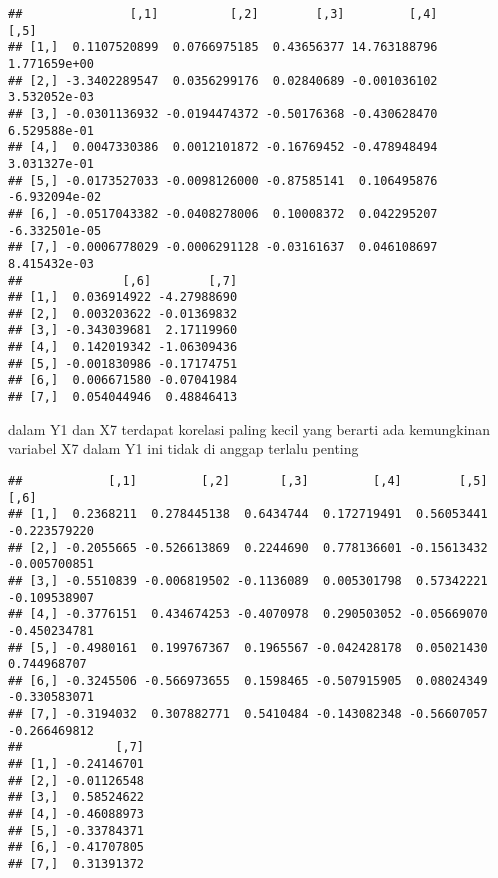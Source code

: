 \documentclass[
]{article}
\newenvironment{Shaded}{\begin{snugshade}}{\end{snugshade}}
\newcommand{\CommentTok}[1]{\textcolor[rgb]{0.56,0.35,0.01}{\textit{#1}}}
\newcommand{\FunctionTok}[1]{\textcolor[rgb]{0.00,0.00,0.00}{#1}}
\newcommand{\NormalTok}[1]{#1}
\newcommand{\OtherTok}[1]{\textcolor[rgb]{0.56,0.35,0.01}{#1}}
\newcommand{\SpecialCharTok}[1]{\textcolor[rgb]{0.00,0.00,0.00}{#1}}
\begin{document}
\begin{verbatim}
##               [,1]          [,2]        [,3]         [,4]          [,5]
## [1,]  0.1107520899  0.0766975185  0.43656377 14.763188796  1.771659e+00
## [2,] -3.3402289547  0.0356299176  0.02840689 -0.001036102  3.532052e-03
## [3,] -0.0301136932 -0.0194474372 -0.50176368 -0.430628470  6.529588e-01
## [4,]  0.0047330386  0.0012101872 -0.16769452 -0.478948494  3.031327e-01
## [5,] -0.0173527033 -0.0098126000 -0.87585141  0.106495876 -6.932094e-02
## [6,] -0.0517043382 -0.0408278006  0.10008372  0.042295207 -6.332501e-05
## [7,] -0.0006778029 -0.0006291128 -0.03161637  0.046108697  8.415432e-03
##              [,6]        [,7]
## [1,]  0.036914922 -4.27988690
## [2,]  0.003203622 -0.01369832
## [3,] -0.343039681  2.17119960
## [4,]  0.142019342 -1.06309436
## [5,] -0.001830986 -0.17174751
## [6,]  0.006671580 -0.07041984
## [7,]  0.054044946  0.48846413
\end{verbatim}

dalam Y1 dan X7 terdapat korelasi paling kecil yang berarti ada
kemungkinan variabel X7 dalam Y1 ini tidak di anggap terlalu penting

\begin{Shaded}
\end{Shaded}

\begin{verbatim}
##            [,1]         [,2]       [,3]         [,4]        [,5]         [,6]
## [1,]  0.2368211  0.278445138  0.6434744  0.172719491  0.56053441 -0.223579220
## [2,] -0.2055665 -0.526613869  0.2244690  0.778136601 -0.15613432 -0.005700851
## [3,] -0.5510839 -0.006819502 -0.1136089  0.005301798  0.57342221 -0.109538907
## [4,] -0.3776151  0.434674253 -0.4070978  0.290503052 -0.05669070 -0.450234781
## [5,] -0.4980161  0.199767367  0.1965567 -0.042428178  0.05021430  0.744968707
## [6,] -0.3245506 -0.566973655  0.1598465 -0.507915905  0.08024349 -0.330583071
## [7,] -0.3194032  0.307882771  0.5410484 -0.143082348 -0.56607057 -0.266469812
##             [,7]
## [1,] -0.24146701
## [2,] -0.01126548
## [3,]  0.58524622
## [4,] -0.46088973
## [5,] -0.33784371
## [6,] -0.41707805
## [7,]  0.31391372
\end{verbatim}
\end{document}
